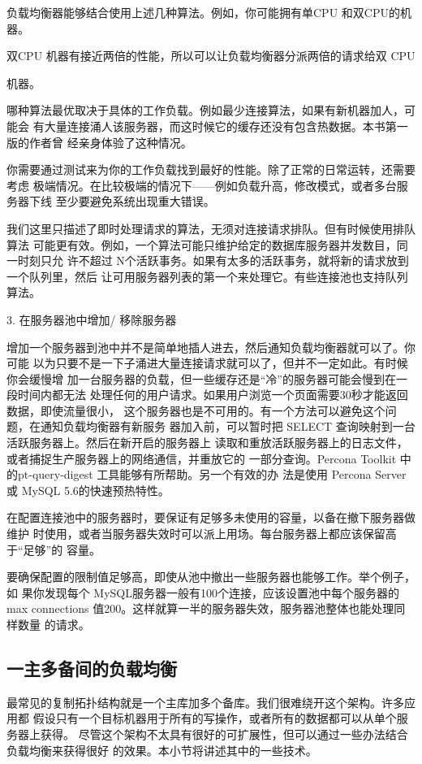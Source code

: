 负载均衡器能够结合使用上述几种算法。例如，你可能拥有单CPU 和双CPU的机器。

双CPU 机器有接近两倍的性能，所以可以让负载均衡器分派两倍的请求给双 CPU

机器。

哪种算法最优取决于具体的工作负载。例如最少连接算法，如果有新机器加人，可能会
有大量连接涌人该服务器，而这时候它的缓存还没有包含热数据。本书第一版的作者曾
经亲身体验了这种情况。

你需要通过测试来为你的工作负载找到最好的性能。除了正常的日常运转，还需要考虑
极端情况。在比较极端的情况下——例如负载升高，修改模式，或者多台服务器下线
至少要避免系统出现重大错误。

我们这里只描述了即时处理请求的算法，无须对连接请求排队。但有时候使用排队算法
可能更有效。例如，一个算法可能只维护给定的数据库服务器并发数目，同一时刻只允
许不超过 N个活跃事务。如果有太多的活跃事务，就将新的请求放到一个队列里，然后
让可用服务器列表的第一个来处理它。有些连接池也支持队列算法。

3. 在服务器池中增加/ 移除服务器

增加一个服务器到池中并不是简单地插人进去，然后通知负载均衡器就可以了。你可能
以为只要不是一下子涌进大量连接请求就可以了，但并不一定如此。有时候你会缓慢增
加一台服务器的负载，但一些缓存还是“冷”的服务器可能会慢到在一段时间内都无法
处理任何的用户请求。如果用户浏览一个页面需要30秒才能返回数据，即使流量很小，
这个服务器也是不可用的。有一个方法可以避免这个问题，在通知负载均衡器有新服务
器加入前，可以暂时把 SELECT 查询映射到一台活跃服务器上。然后在新开启的服务器上
读取和重放活跃服务器上的日志文件，或者捕捉生产服务器上的网络通信，并重放它的
一部分查询。Percona Toolkit 中的pt-query-digest 工具能够有所帮助。另一个有效的办
法是使用 Percona Server 或 MySQL 5.6的快速预热特性。

在配置连接池中的服务器时，要保证有足够多未使用的容量，以备在撤下服务器做维护
时使用，或者当服务器失效时可以派上用场。每台服务器上都应该保留高于“足够”的
容量。

要确保配置的限制值足够高，即使从池中撤出一些服务器也能够工作。举个例子，如
果你发现每个 MySQL服务器一般有100个连接，应该设置池中每个服务器的max
connections 值200。这样就算一半的服务器失效，服务器池整体也能处理同样数量
的请求。

\subsection{一主多备间的负载均衡}
最常见的复制拓扑结构就是一个主库加多个备库。我们很难绕开这个架构。许多应用都
假设只有一个目标机器用于所有的写操作，或者所有的数据都可以从单个服务器上获得。
尽管这个架构不太具有很好的可扩展性，但可以通过一些办法结合负载均衡来获得很好
的效果。本小节将讲述其中的一些技术。

